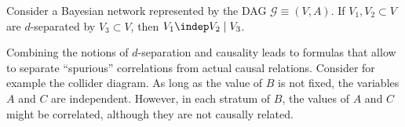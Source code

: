     \begin{property}
        Consider a Bayesian network represented by the DAG $\mathcal{G}\equiv(V,A)$. If $V_1,V_2\subset V$ are $d$-separated by $V_3\subset V$, then $V_1\indep V_2\mid V_3$.
    \end{property}


    Combining the notions of $d$-separation and causality leads to formulas that allow to separate ``spurious'' correlations from actual causal relations. Consider for example the collider diagram. As long as the value of $B$ is not fixed, the variables $A$ and $C$ are independent. However, in each stratum of $B$, the values of $A$ and $C$ might be correlated, although they are not causally related.